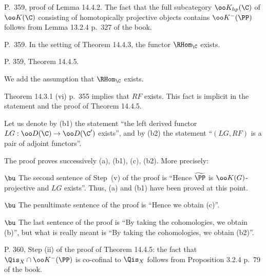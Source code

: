 \documentclass[12pt]{article}
\theoremstyle{remark}
\theoremstyle{definition}
\begin{document}
%

\begin{s}
P.~359, proof of Lemma 14.4.2. The fact that the full subcategory $\oo K_{hp}(\C)$ of $\oo K(\C)$ consisting of homotopically projective objects contains $\oo K^-(\PP)$ follows from Lemma 13.2.4 p.~327 of the book. 
\end{s}

%

\begin{s}
P.~359. In the setting of Theorem 14.4.3, the functor $\RHom_\C$ exists. 
\end{s}

%

\begin{s}
P. 359, Theorem 14.4.5. 

We add the assumption that $\RHom_\C$ exists.%

Theorem 14.3.1 (vi) p.~355 implies that $RF$ exists. This fact is implicit in the statement and the proof of Theorem 14.4.5.

Let us denote by (b1) the statement ``the left derived functor $LG:\oo D(\C)\to\oo D(\C')$ exists'', and by (b2) the statement ``$(LG,RF)$ is a pair of adjoint functors''.

The proof proves successively (a), (b1), (c), (b2). More precisely:

\nn$\bu$ The second sentence of Step~(v) of the proof is ``Hence $\widetilde\PP$ is $\oo K(G)$-projective and $LG$ exists''. Thus, (a) and (b1) have been proved at this point. 

\nn$\bu$ The penultimate sentence of the proof is ``Hence we obtain (c)''. 

\nn$\bu$ The last sentence of the proof is ``By taking the cohomologies, we obtain (b)'', but what is really meant is ``By taking the cohomologies, we obtain (b2)''.
\end{s}

%

\begin{s}
P. 360, Step (ii) of the proof of Theorem 14.4.5: the fact that $\Qis_X\cap\oo K^-(\PP)$ is co-cofinal to $\Qis_X$ follows from Proposition 3.2.4 p.~79 of the book.
\end{s}

\end{document}
